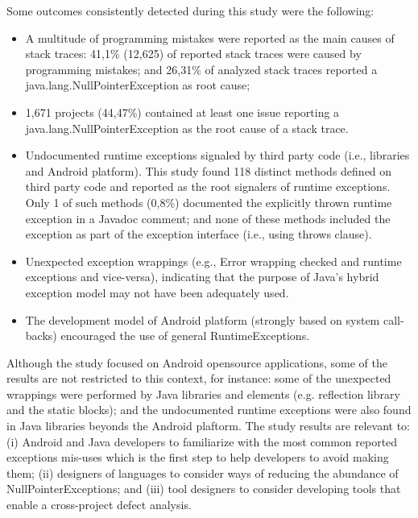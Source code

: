 \documentclass[conference]{IEEEtran}
\begin{document}
Some outcomes consistently detected during this study were the following:

\begin{itemize}

   \item  A multitude of programming mistakes were reported as the main causes of stack traces:
  41,1\%  (12,625)  of reported stack traces were caused by programming mistakes; and 26,31\% of analyzed stack traces reported a java.lang.NullPointerException as root cause;

   \item 1,671 projects (44,47\%) contained at least one issue reporting a java.lang.NullPointerException as the root cause of a stack trace.

   \item Undocumented runtime exceptions signaled by third party
    code (i.e., libraries and Android platform). This study found 118 distinct methods defined on third party code and  reported as the root signalers of runtime exceptions. Only 1 of such methods (0,8\%) documented the explicitly thrown runtime exception in a Javadoc comment; and none of these methods included the exception as part of the exception interface (i.e., using throws clause).

   \item  Unexpected exception wrappings (e.g., Error wrapping checked and runtime
    exceptions and vice-versa), indicating that the purpose of Java's hybrid exception model may not have been adequately used.

   \item  The development model of Android platform (strongly based on system call-backs) encouraged 
     the use of general RuntimeExceptions.


\end{itemize}

Although the study focused on Android opensource applications, some of the results are not restricted to this context, 
for instance: some of the unexpected wrappings were performed by Java libraries and elements (e.g. reflection library and 
the static blocks); and the undocumented runtime exceptions were also found in Java libraries beyonds the Android plaftorm.
The study results are relevant to: (i) Android and Java developers to familiarize with the most common reported exceptions 
mis-uses which is the first step to help developers to avoid making them; (ii) designers of languages to consider ways of reducing the abundance of NullPointerExceptions; and (iii) tool designers to consider developing tools that enable a cross-project defect analysis.
\end{document}
